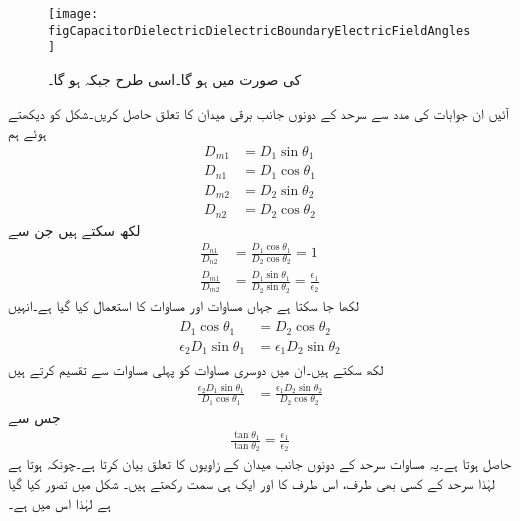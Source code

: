 \begin{figure}
\centering
\texttt{[image: figCapacitorDielectricDielectricBoundaryElectricFieldAngles]}
\caption{ کی صورت میں  ہو گا۔اسی طرح  جبکہ  ہو گا۔}
\label{شکل_کپیسٹر_دو_ذو_برق_پر_بہاو}
\end{figure}
آئیں ان جوابات کی مدد سے سرحد کے دونوں جانب برقی میدان کا تعلق حاصل کریں۔شکل  کو دیکھتے ہوئے ہم 
\begin{align*}
D_{m1}&=D_1 \sin \theta_1\\
D_{n1}&=D_1 \cos \theta_1\\
D_{m2}&=D_2\sin\theta_2\\
D_{n2}&=D_2 \cos \theta_2
\end{align*}
لکھ سکتے ہیں جن سے
\begin{align*}
\frac{D_{n1}}{D_{n2}}&=\frac{D_1 \cos \theta_1}{D_2\cos\theta_2}=1 \\
\frac{D_{m1}}{D_{m2}}&=\frac{D_1 \sin \theta_1}{D_2\sin\theta_2}=\frac{\epsilon_1}{\epsilon_2}
\end{align*}
لکھا جا سکتا ہے جہاں مساوات  اور  مساوات  کا استعمال کیا گیا ہے۔انہیں
\begin{gather}
\begin{aligned}\label{مساوات_کپیسٹر_برقی_بہاو_سرحد_دونوں_جانب}
D_1 \cos \theta_1&=D_2 \cos \theta_2\\
\epsilon_2 D_1 \sin \theta_1&=\epsilon_1 D_2\sin\theta_2
\end{aligned}
\end{gather}
لکھ سکتے ہیں۔ان میں دوسری مساوات کو پہلی مساوات سے تقسیم کرتے ہیں
\begin{align*}
\frac{\epsilon_2 D_1 \sin \theta_1}{D_1 \cos \theta_1}&=\frac{\epsilon_1 D_2\sin\theta_2}{D_2 \cos \theta_2}
\end{align*}
جس سے
\begin{align}
\frac{\tan \theta_1}{\tan \theta_2}=\frac{\epsilon_1}{\epsilon_2}
\end{align}
حاصل ہوتا ہے۔یہ مساوات سرحد کے دونوں جانب میدان کے زاویوں کا تعلق بیان کرتا ہے۔چونکہ  ہوتا ہے لہٰذا سرحد کے کسی بھی طرف، اس طرف کا  اور  ایک ہی سمت رکھتے ہیں۔  شکل میں  تصور کیا گیا ہے لہٰذا اس میں  ہے۔

